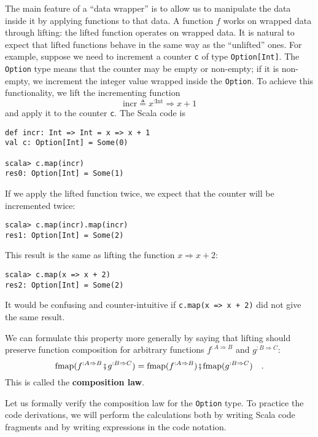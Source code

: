 The main feature of a ``data wrapper'' is to allow us to manipulate
the data inside it by applying functions to that data. A function
$f$ works on wrapped data through lifting: the lifted function operates
on wrapped data. It is natural to expect that lifted functions behave
in the same way as the ``unlifted'' ones. For example, suppose we
need to increment a counter \lstinline!c! of type \lstinline!Option[Int]!.
The \lstinline!Option! type means that the counter may be empty or
non-empty; if it is non-empty, we increment the integer value wrapped
inside the \lstinline!Option!. To achieve this functionality, we
lift the incrementing function
\[
\text{incr}\triangleq x^{:\text{Int}}\Rightarrow x+1
\]
and apply it to the counter \lstinline!c!. The Scala code is
\begin{lstlisting}
def incr: Int => Int = x => x + 1
val c: Option[Int] = Some(0)

scala> c.map(incr)
res0: Option[Int] = Some(1) 
\end{lstlisting}
If we apply the lifted function twice, we expect that the counter
will be incremented twice:
\begin{lstlisting}
scala> c.map(incr).map(incr)
res1: Option[Int] = Some(2)
\end{lstlisting}
This result is the same as lifting the function $x\Rightarrow x+2$:
\begin{lstlisting}
scala> c.map(x => x + 2)
res2: Option[Int] = Some(2)
\end{lstlisting}
It would be confusing and counter-intuitive if \lstinline!c.map(x => x + 2)!
did not give the same result. 

We can formulate this property more generally by saying that lifting
should preserve function composition for arbitrary functions $f^{:A\Rightarrow B}$
and $g^{:B\Rightarrow C}$:
\[
\text{fmap}(f^{:A\Rightarrow B}\bef g^{:B\Rightarrow C})=\text{fmap}(f^{:A\Rightarrow B})\bef\text{fmap}(g^{:B\Rightarrow C})\quad.
\]
This is called the \textbf{composition law}.

Let us formally verify the composition law for the \lstinline!Option!
type. To practice the code derivations, we will perform the calculations
both by writing Scala code fragments and by writing expressions in
the code notation.

